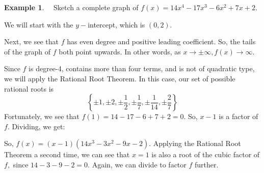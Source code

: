 \documentclass[12pt]{book}
\theoremstyle{definition}
\newtheorem{example}{Example}
\begin{document}
\begin{example}~~Sketch a complete graph of $f(x)=14x^4-17x^3-6x^2+7x+2$.\par
We will start with the $y-$intercept, which is $(0,2)$.\par
Next, we see that $f$ has even degree and positive leading coefficient.  So, the tails of the graph of $f$ both point upwards.  In other words, as $x\rightarrow\pm\infty, f(x)\rightarrow\infty$.\par
Since $f$ is degree-4, contains more than four terms, and is not of quadratic type, we will apply the Rational Root Theorem.  In this case, our set of possible rational roots is
$$\left\{\pm 1, \pm 2, \pm \frac{1}{2}, \pm \frac{1}{7}, \pm \frac{1}{14}, \pm \frac{2}{7}\right\}$$
Fortunately, we see that $f(1)=14-17-6+7+2=0$.  So, $x-1$ is a factor of $f$.  Dividing, we get:
\begin{multicols}{2}

\columnbreak

\end{multicols}
So, $f(x)=(x-1)(14x^3-3x^2-9x-2).$  Applying the Rational Root Theorem a second time, we can see that $x=1$ is also a root of the cubic factor of $f,$ since $14-3-9-2=0$.  Again, we can divide to factor $f$ further.
\begin{multicols}{2}

\columnbreak


\end{multicols}
\end{example}
\end{document}
